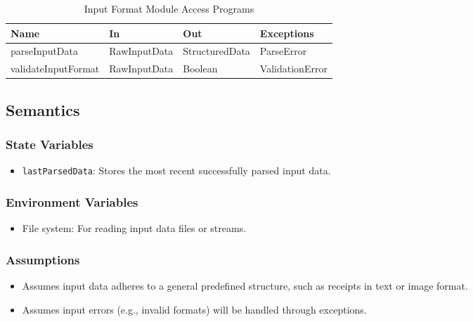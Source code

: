 \documentclass[12pt, titlepage]{article}
\begin{document}
\begin{center}
  \begin{table}[H]
    \caption{Input Format Module Access Programs}
\begin{tabular}{p{4cm} p{4cm} p{4cm} p{4cm}}
\hline
\textbf{Name} & \textbf{In} & \textbf{Out} & \textbf{Exceptions} \\
\hline
parseInputData & RawInputData & StructuredData & ParseError \\
\hline
validateInputFormat & RawInputData & Boolean & ValidationError \\
\hline
\end{tabular}
\end{table}
\end{center}

\subsection{Semantics}

\subsubsection{State Variables}

\begin{itemize}
    \item \texttt{lastParsedData}: Stores the most recent successfully parsed input data.
\end{itemize}

\subsubsection{Environment Variables}

\begin{itemize}
    \item File system: For reading input data files or streams.
\end{itemize}

\subsubsection{Assumptions}

\begin{itemize}
    \item Assumes input data adheres to a general predefined structure, such as receipts in text or image format.
    \item Assumes input errors (e.g., invalid formats) will be handled through exceptions.
\end{itemize}
\end{document}
